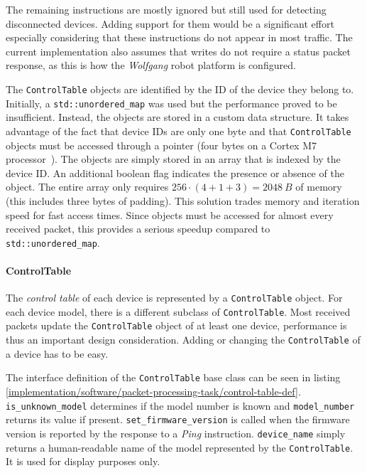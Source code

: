 The remaining instructions are mostly ignored but still used for detecting disconnected devices.
Adding support for them would be a significant effort especially considering that these instructions
do not appear in most traffic. The current implementation also assumes that writes do not require a
status packet response, as this is how the \textit{Wolfgang} robot platform is configured.

The \lstinline{ControlTable} objects are identified by the ID of the device they belong to. Initially,
a \lstinline{std::unordered_map} was used but the performance proved to be insufficient. Instead, the
objects are stored in a custom data structure. It takes advantage of the fact that device IDs are
only one byte and that \lstinline{ControlTable} objects must be accessed through a pointer (four bytes
on a Cortex M7 processor~\cite{mcu-ref-manual}). The objects are simply stored in an array that is
indexed by the device ID. An additional boolean flag indicates the presence or absence of the object. The
entire array only requires $256 \cdot (4 + 1 + 3) = \SI{2048}{B}$ of memory (this includes three bytes
of padding).
This solution trades memory and iteration speed for fast access times. Since objects must be accessed
for almost every received packet, this provides a serious speedup compared to \lstinline{std::unordered_map}.

\paragraph{ControlTable}

The \textit{control table} of each device is represented by a \lstinline{ControlTable} object. For
each device model, there is a different subclass of \lstinline{ControlTable}. Most received packets
update the \lstinline{ControlTable} object of at least one device, performance is thus an important
design consideration. Adding or changing the \lstinline{ControlTable} of a device has to be easy.

The interface definition of the \lstinline{ControlTable} base class can be seen in listing
\ref{implementation/software/packet-processing-task/control-table-def}. \lstinline{is_unknown_model}
determines if the model number is known and \lstinline{model_number} returns its value if present.
\lstinline{set_firmware_version} is called when the firmware version is reported by the response
to a \textit{Ping} instruction. \lstinline{device_name} simply returns a human-readable name of the
model represented by the \lstinline{ControlTable}. It is used for display purposes only.

